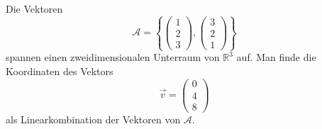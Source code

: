 \begin{beispiel}
Die Vektoren \[
\mathcal{A}=\left\{
\begin{pmatrix}1\\2\\3\end{pmatrix},
\begin{pmatrix}3\\2\\1\end{pmatrix}
\right\}
\]
spannen einen zweidimensionalen Unterraum von $\mathbb R^3$ auf.
Man finde
die Koordinaten des Vektors
\[
\vec{v}
=
\begin{pmatrix}
0\\4\\8
\end{pmatrix}
\]
als Linearkombination der Vektoren von $\mathcal{A}$.


\end{beispiel}
